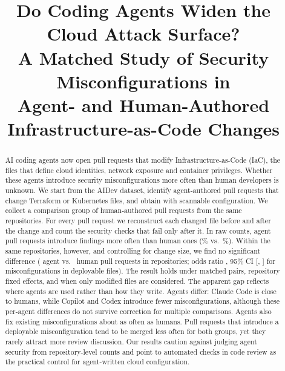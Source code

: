 \documentclass[10pt,conference]{IEEEtran}
\begin{document}
\title{Do Coding Agents Widen the Cloud Attack Surface?\\
A Matched Study of Security Misconfigurations in\\ Agent- and Human-Authored Infrastructure-as-Code Changes}

\author{}

\maketitle

\begin{abstract}
AI coding agents now open pull requests that modify Infrastructure-as-Code (IaC), the files that define cloud identities, network exposure and container privileges. Whether these agents introduce security misconfigurations more often than human developers is unknown. We start from the AIDev dataset, identify \NaidevIac{} agent-authored pull requests that change Terraform or Kubernetes files, and obtain \NagentAll{} with scannable configuration. We collect a comparison group of \NhumanAll{} human-authored pull requests from the same repositories. For every pull request we reconstruct each changed file before and after the change and count the security checks that fail only after it. In raw counts, agent pull requests introduce findings more often than human ones (\RawAgentPct\% vs.\ \RawHumanPct\%). Within the same repositories, however, and controlling for change size, we find no significant difference (\NagentSame{} agent vs.\ \NhumanSame{} human pull requests in \Nrepos{} repositories; odds ratio \ORProd, 95\% CI [\ORloProd, \ORhiProd] for misconfigurations in deployable files). The result holds under matched pairs, repository fixed effects, and when only modified files are considered. The apparent gap reflects where agents are used rather than how they write. Agents differ: Claude Code is close to humans, while Copilot and Codex introduce fewer misconfigurations, although these per-agent differences do not survive correction for multiple comparisons. Agents also fix existing misconfigurations about as often as humans. Pull requests that introduce a deployable misconfiguration tend to be merged less often for both groups, yet they rarely attract more review discussion. Our results caution against judging agent security from repository-level counts and point to automated checks in code review as the practical control for agent-written cloud configuration.
\end{abstract}
\end{document}
